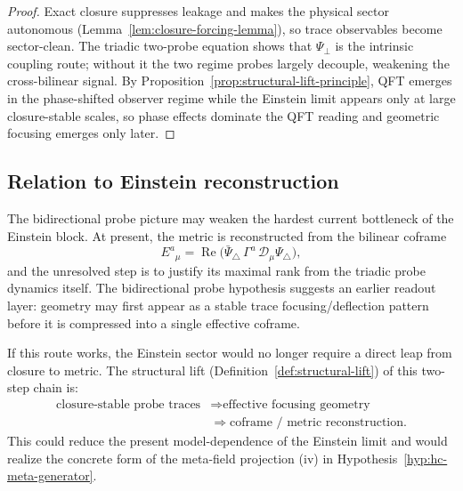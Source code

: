\begin{proof}
Exact closure suppresses leakage and makes the physical sector
autonomous (Lemma~\ref{lem:closure-forcing-lemma}), so trace observables
become sector-clean. The triadic two-probe equation shows that
$\Psi_\perp$ is the intrinsic coupling route; without it the two regime
probes largely decouple, weakening the cross-bilinear signal. By
Proposition~\ref{prop:structural-lift-principle}, QFT emerges in the
phase-shifted observer regime while the Einstein limit appears only at
large closure-stable scales, so phase effects dominate the QFT reading
and geometric focusing emerges only later.
\end{proof}

\subsection*{Relation to Einstein reconstruction}

The bidirectional probe picture may weaken the hardest current
bottleneck of the Einstein block. At present, the metric is reconstructed
from the bilinear coframe
\[
 E^a{}_\mu
 =
 \operatorname{Re}\bigl(
 \bar\Psi_\triangle\,\Gamma^a\,\mathcal{D}_\mu\Psi_\triangle
 \bigr),
\]
and the unresolved step is to justify its maximal rank from the triadic
probe dynamics itself. The bidirectional probe hypothesis suggests an
earlier readout layer: geometry may first appear as a stable trace
focusing/deflection pattern before it is compressed into a single
effective coframe.

\begin{remark}
If this route works, the Einstein sector would no longer require a
direct leap from closure to metric. The structural lift
(Definition~\ref{def:structural-lift}) of this two-step chain is:
\[
\begin{aligned}
\text{closure-stable probe traces}
&\Longrightarrow \text{effective focusing geometry}\\
&\Longrightarrow \text{coframe / metric reconstruction}.
\end{aligned}
\]
This could reduce the present model-dependence of the Einstein limit and
would realize the concrete form of the meta-field projection
(iv) in Hypothesis~\ref{hyp:hc-meta-generator}.
\end{remark}


